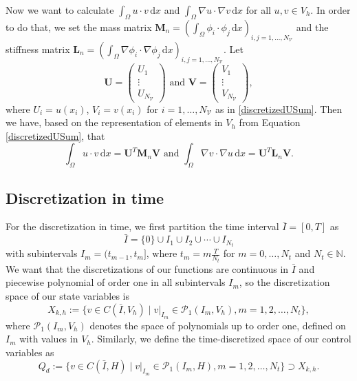 Now we want to calculate $\int_\Omega u \cdot v \,\mathrm{d}x$ and $\int_\Omega \nabla u \cdot \nabla v \,\mathrm{d}x$ for all $u,v\in  V_h$. In order to do that, we set the mass matrix $\mathbf{M}_n = \left(\int_\Omega \phi_i \cdot \phi_j \,\mathrm{d}x\right)_{i,j=1,\dotsc,N_\mathcal{V}}$ and the stiffness matrix $\mathbf{L}_n = \left(\int_\Omega \nabla\phi_i \cdot \nabla\phi_j \,\mathrm{d}x\right)_{i,j=1,\dotsc,N_\mathcal{V}}$. Let%
\begin{displaymath}
\mathbf{U}=\begin{pmatrix} U_1 \\ \vdots \\ U_{N_\mathcal{V}} \end{pmatrix}\text{ and }\mathbf{V}=\begin{pmatrix} V_1 \\ \vdots \\ V_{N_\mathcal{V}} \end{pmatrix},
\end{displaymath}
where $U_i=u(x_i)$, $V_i=v(x_i)$ for $i=1,\dotsc,N_\mathcal{V}$ as in \eqref{discretizedUSum}. Then we have, based on the representation of elements in $V_h$ from Equation \eqref{discretizedUSum}, that
\begin{displaymath}
\int_\Omega u \cdot v \,\mathrm{d}x=\mathbf{U}^T\mathbf{M}_n\mathbf{V}\text{ and }\int_\Omega \nabla v \cdot \nabla u \,\mathrm{d}x=\mathbf{U}^T\mathbf{L}_n\mathbf{V}.
\end{displaymath}


\subsection{\label{SubsectionDiscretizationInTime}Discretization in time}
For the discretization in time, we first partition the time interval $\bar{I}=[0,T]$ as
\begin{displaymath}
\bar{I}=\{0\}\cup I_1\cup I_2\cup\dotsb\cup I_{N_t}
\end{displaymath}
with subintervals $I_m=(t_{m-1},t_m]$, where $t_m=m\frac{T}{N_t}$ for $m=0,\dotsc, N_t$ and $N_t\in\mathbb{N}$. We want that the discretizations of our functions are continuous in $\bar{I}$ and piecewise polynomial of order one in all subintervals $I_m$, so the discretization space of our state variables is
\begin{displaymath}
X_{k,h}:=\{v\in C(\bar{I},V_h)\mid v |_{I_m}\in\mathcal{P}_1(I_m,V_h),m=1,2,\dotsc,N_t\},
\end{displaymath}
where $\mathcal{P}_1(I_m,V_h)$ denotes the space of polynomials up to order one, defined on $I_m$ with values in $V_h$.
Similarly, we define the time-discretized space of our control variables as
\begin{displaymath}
Q_d:=\{v\in C(\bar{I},H)\mid v |_{I_m}\in\mathcal{P}_1(I_m,H),m=1,2,\dotsc,N_t\}\supset X_{k,h}.
\end{displaymath}

